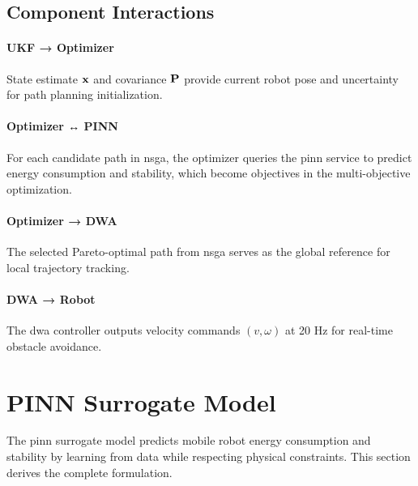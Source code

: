 
\subsection{Component Interactions}

\paragraph{UKF → Optimizer} State estimate $\mathbf{x}$ and covariance $\mathbf{P}$ provide current robot pose and uncertainty for path planning initialization.

\paragraph{Optimizer ↔ PINN} For each candidate path in \acrshort{nsga}, the optimizer queries the \acrshort{pinn} service to predict energy consumption and stability, which become objectives in the multi-objective optimization.

\paragraph{Optimizer → DWA} The selected Pareto-optimal path from \acrshort{nsga} serves as the global reference for local trajectory tracking.

\paragraph{DWA → Robot} The \acrshort{dwa} controller outputs velocity commands $(v, \omega)$ at 20 Hz for real-time obstacle avoidance.

\section{PINN Surrogate Model}
\label{sec:meth_pinn}

The \acrshort{pinn} surrogate model predicts mobile robot energy consumption and stability by learning from data while respecting physical constraints. This section derives the complete formulation.



